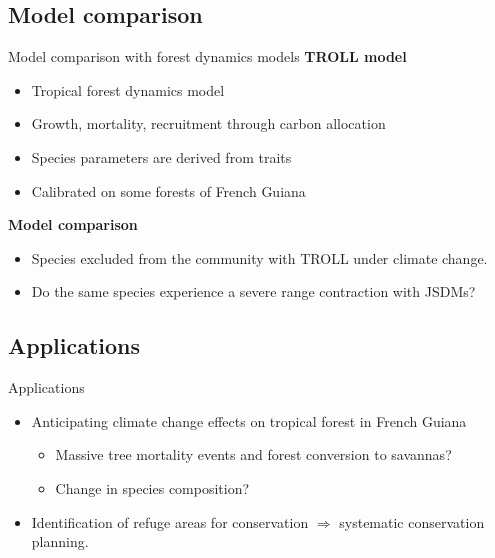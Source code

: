 \documentclass[
  10pt,
  ignorenonframetext,
  table, dvipsname, compress]{beamer}
\providecommand{\tightlist}{%
  \setlength{\itemsep}{0pt}\setlength{\parskip}{0pt}}
\begin{document}
\hypertarget{model-comparison}{%
\subsection{Model comparison}\label{model-comparison}}

\begin{frame}{Model comparison with forest dynamics models}
\protect\hypertarget{model-comparison-with-forest-dynamics-models}{}
\textbf{TROLL model}

\begin{itemize}
\tightlist
\item
  Tropical forest dynamics model
\item
  Growth, mortality, recruitment through carbon allocation
\item
  Species parameters are derived from traits
\item
  Calibrated on some forests of French Guiana
\end{itemize}

\textbf{Model comparison}

\begin{itemize}
\tightlist
\item
  Species excluded from the community with TROLL under climate change.
\item
  Do the same species experience a severe range contraction with JSDMs?
\end{itemize}
\end{frame}

\hypertarget{applications}{%
\subsection{Applications}\label{applications}}

\begin{frame}{Applications}
\protect\hypertarget{applications-1}{}
\begin{itemize}
\tightlist
\item
  Anticipating climate change effects on tropical forest in French
  Guiana

  \begin{itemize}
  \tightlist
  \item
    Massive tree mortality events and forest conversion to savannas?
  \item
    Change in species composition?
  \end{itemize}
\item
  Identification of refuge areas for conservation \(\Rightarrow\)
  systematic conservation planning.
\end{itemize}
\end{frame}
\end{document}
